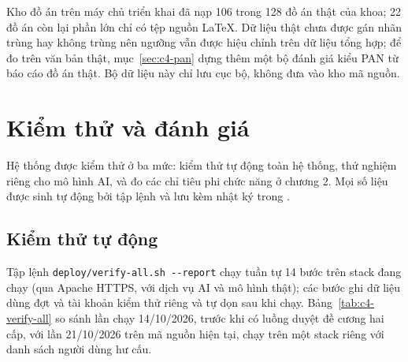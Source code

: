 \documentclass[../main.tex]{subfiles}
\begin{document}
Kho đồ án trên máy chủ triển khai đã nạp 106 trong 128 đồ án thật của khoa; 22 đồ án còn lại phần lớn chỉ có tệp nguồn LaTeX. Dữ liệu thật chưa được gán nhãn trùng hay không trùng nên ngưỡng vẫn được hiệu chỉnh trên dữ liệu tổng hợp; để đo trên văn bản thật, mục~\ref{sec:c4-pan} dựng thêm một bộ đánh giá kiểu PAN từ báo cáo đồ án thật. Bộ dữ liệu này chỉ lưu cục bộ, không đưa vào kho mã nguồn.

\section{Kiểm thử và đánh giá}\label{sec:c4-kiem-thu}

Hệ thống được kiểm thử ở ba mức: kiểm thử tự động toàn hệ thống, thử nghiệm riêng cho mô hình AI, và đo các chỉ tiêu phi chức năng ở chương 2. Mọi số liệu được sinh tự động bởi tập lệnh và lưu kèm nhật ký trong .

\subsection{Kiểm thử tự động}

Tập lệnh \texttt{deploy/verify-all.sh -{}-report} chạy tuần tự 14 bước trên stack đang chạy (qua Apache HTTPS, với dịch vụ AI và mô hình thật); các bước ghi dữ liệu dùng đợt và tài khoản kiểm thử riêng và tự dọn sau khi chạy. Bảng~\ref{tab:c4-verify-all} so sánh lần chạy 14/10/2026, trước khi có luồng duyệt đề cương hai cấp, với lần 21/10/2026 trên mã nguồn hiện tại, chạy trên một stack riêng với danh sách người dùng hư cấu.
\end{document}
